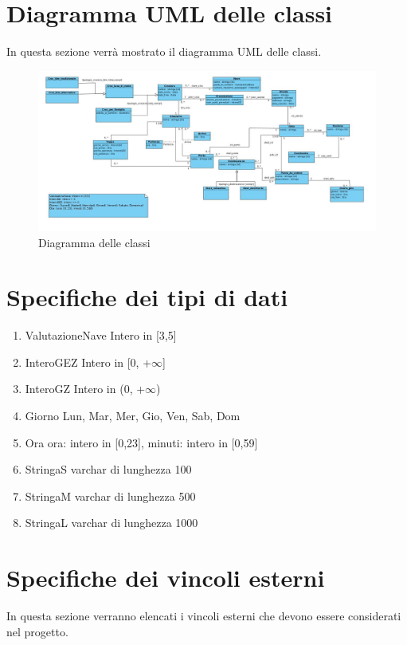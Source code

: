 \documentclass{article}
\begin{document}
\section{Diagramma UML delle classi}

In questa sezione verrà mostrato il diagramma UML delle classi.
\begin{figure}[h]
    \centering
    \includegraphics[width=\textwidth]{../Diagramma delle classi Travel To The Moon.jpg}
    \caption{Diagramma delle classi}
    \end{figure}

\section{Specifiche dei tipi di dati}

\begin{enumerate}
    \item ValutazioneNave Intero in [3,5]
    \item InteroGEZ Intero in [0, +$\infty$]
    \item InteroGZ Intero in (0, +$\infty$)
    \item Giorno {Lun, Mar, Mer, Gio, Ven, Sab, Dom}
    \item Ora {ora: intero in [0,23], minuti: intero in [0,59]}
    \item StringaS varchar di lunghezza 100
    \item StringaM varchar di lunghezza 500
    \item StringaL varchar di lunghezza 1000
\end{enumerate}



\section{Specifiche dei vincoli esterni}

In questa sezione verranno elencati i vincoli esterni che devono essere considerati nel progetto.
\end{document}
